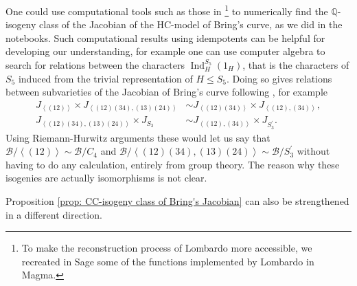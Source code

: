 \documentclass{amsart}
\newcommand{\pangle}[1]{\left\langle #1 \right\rangle}
\begin{document}
One could use computational tools such as those in \cite{Booker2016, Lombardo2018}\footnote{To make the reconstruction process of Lombardo more accessible, we recreated in Sage some of the functions implemented by Lombardo in Magma.} to numerically find the $\mathbb{Q}$-isogeny class of the Jacobian of the HC-model of Bring's curve, as we did in the notebooks. Such computational results using idempotents can be helpful for developing our understanding, for example one can use computer algebra to search for relations between the characters $\operatorname{Ind}_H^{S_5}(1_H)$, that is the characters of $S_5$ induced from the trivial representation of $H \leq S_5$. Doing so gives relations between subvarieties of the Jacobian of Bring's curve following \cite[Theorem 3]{Kani1989}, for example 
\begin{equation}
\begin{aligned}\label{isogenies}
    J_{\pangle{(12)}} \times J_{\pangle{(12)(34), (13)(24)}} & \sim J_{\pangle{(12)(34)}} \times J_{\pangle{(12), (34)}} , \\
    J_{\pangle{(12)(34), (13)(24)}} \times J_{S_3} &\sim J_{\pangle{(12), (34)}} \times J_{S_3^\prime} .
\end{aligned}
\end{equation}
Using Riemann-Hurwitz arguments these would let us say that $\mathcal{B}/\pangle{(12)} \sim \mathcal{B}/C_4$ and $\mathcal{B}/\pangle{(12)(34), (13)(24)} \sim \mathcal{B}/S_3^\prime$ without having to do any calculation, entirely from group theory. The reason why these isogenies are actually isomorphisms is not clear.


Proposition \ref{prop: CC-isogeny class of Bring's Jacobian} can also be strengthened in a different direction.
\end{document}
